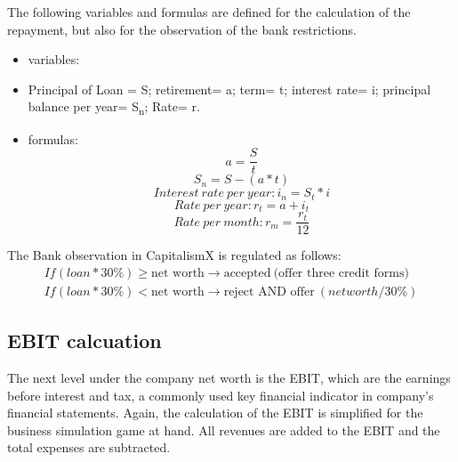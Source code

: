 The following variables and formulas are defined for the calculation of the repayment, but also for the observation of the bank restrictions.

\begin{itemize}
    \item variables:
    \item Principal of Loan = S; retirement= a; term= t; interest rate= i; principal balance per year= S\textsubscript{n}; Rate= r. 
    \item formulas:
 $$a={\dfrac{S}{t}}$$
 $$S_n=S-(a*t)$$
 $$Interest\ rate\ per\ year: i_n=S_t*i $$
 $$Rate\ per\ year: r_t=a+i_t$$
$$Rate\ per\ month:r_m= {\dfrac{r_t}{12}} $$
    
\end{itemize}

The Bank observation in CapitalismX is regulated as follows:
\begin{equation}
\begin{aligned}
    If (loan * 30\% ) \geq  \text{net worth} \xrightarrow{} \text{accepted} \ \text{(offer three credit forms)} \\
    If (loan * 30\%) < \text{net worth} \xrightarrow{} \text{reject AND offer} \ (net worth / 30\%)
\end{aligned}    
\end{equation}


\subsection{EBIT calcuation}
The next level under the company net worth is the EBIT, which are the earnings before interest and tax, a commonly used key financial indicator in company's financial statements. \cite{lee_e_2006} Again, the calculation of the EBIT is simplified for the business simulation game at hand. All revenues are added to the EBIT and the total expenses are subtracted. 

